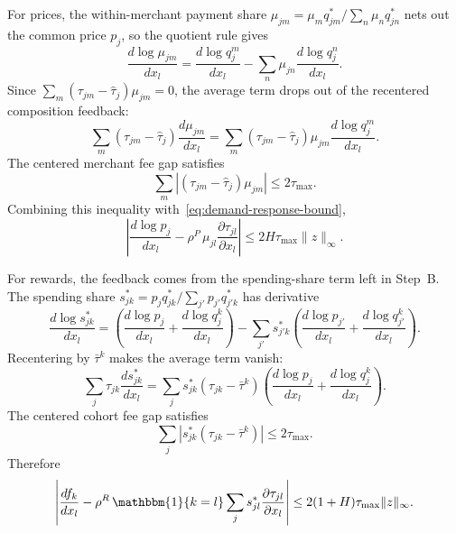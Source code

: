 \documentclass[main.tex]{subfiles}
\begin{document}
For prices, the within-merchant payment share $\mu_{jm}=\mu_m q^*_{jm}/\sum_n\mu_n q^*_{jn}$ nets out the common price $p_j$, so the quotient rule gives
\[
\frac{d\log\mu_{jm}}{dx_l}
=\frac{d\log q^m_j}{dx_l}
-\sum_n\mu_{jn}\frac{d\log q^n_j}{dx_l}.
\]
Since $\sum_m(\tau_{jm}-\hat\tau_j)\mu_{jm}=0$, the average term drops out of the recentered composition feedback:
\[
\sum_m(\tau_{jm}-\hat\tau_j)\frac{d\mu_{jm}}{dx_l}
=\sum_m(\tau_{jm}-\hat\tau_j)\mu_{jm}\frac{d\log q^m_j}{dx_l}.
\]
The centered merchant fee gap satisfies
\[
\sum_m|(\tau_{jm}-\hat\tau_j)\mu_{jm}|\leq 2\tau_{\max}.
\]
Combining this inequality with~\eqref{eq:demand-response-bound},
\begin{equation}
\left|
\frac{d\log p_j}{dx_l}
-\rho^P\,\mu_{jl}\frac{\partial\tau_{jl}}{\partial x_l}
\right|
\leq 2H\tau_{\max}\|z\|_\infty .
\label{eq:price-feedback-bound}
\end{equation}

For rewards, the feedback comes from the spending-share term left in Step~B.
The spending share $s^*_{jk}=p_jq^*_{jk}/\sum_{j'}p_{j'}q^*_{j'k}$ has derivative
\[
\frac{d\log s^*_{jk}}{dx_l}
=\left(\frac{d\log p_j}{dx_l}+\frac{d\log q^k_j}{dx_l}\right)
-\sum_{j'}s^*_{j'k}\left(\frac{d\log p_{j'}}{dx_l}+\frac{d\log q^k_{j'}}{dx_l}\right).
\]
Recentering by $\bar\tau^k$ makes the average term vanish:
\[
\sum_j\tau_{jk}\frac{ds^*_{jk}}{dx_l}
=\sum_j s^*_{jk}(\tau_{jk}-\bar\tau^k)
\left(\frac{d\log p_j}{dx_l}+\frac{d\log q^k_j}{dx_l}\right).
\]
The centered cohort fee gap satisfies
\[
\sum_j|s^*_{jk}(\tau_{jk}-\bar\tau^k)|\leq2\tau_{\max}.
\]
Therefore
\begin{equation}
\left|
\frac{df_k}{dx_l}
-\rho^R\,\mathbbm{1}\{k=l\}\sum_j s^*_{jl}\frac{\partial\tau_{jl}}{\partial x_l}
\right|
\leq 2(1+H)\tau_{\max}\|z\|_\infty .
\label{eq:reward-feedback-bound}
\end{equation}
\end{document}
